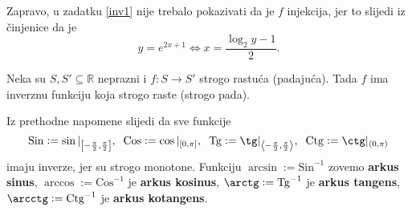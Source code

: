 \begin{remark}
Zapravo, u zadatku \ref{inv1} nije trebalo pokazivati da je $f$ injekcija, jer to slijedi iz činjenice da je
$$y=e^{2x+1}\Leftrightarrow x=\dfrac{\log_2{y}-1}{2}.$$
\end{remark}
\begin{remark}
Neka su $S, S'\subseteq \mathbb{R}$ neprazni i $f : S\to S'$ strogo rastuća (padajuća). Tada $f$ ima inverznu funkciju koja strogo raste (strogo pada).
\end{remark}
Iz prethodne napomene slijedi da sve funkcije $$\mathrm{Sin}:=\sin|_{\left[-\frac{\pi}{2},\frac{\pi}{2}\right]},\;\;\mathrm{Cos}:=\cos|_{\left[0, \pi\right]},\;\;\mathrm{Tg}:=\tg|_{\left\langle-\frac{\pi}{2},\frac{\pi}{2}\right\rangle},\;\;\mathrm{Ctg}:=\ctg|_{\left\langle 0, \pi\right\rangle}$$
imaju inverze, jer su strogo monotone. Funkciju $\arcsin:=\mathrm{Sin}^{-1}$ zovemo \textbf{arkus sinus}, $\arccos:=\mathrm{Cos}^{-1}$ je \textbf{arkus kosinus}, $\arctg:=\mathrm{Tg}^{-1}$ je \textbf{arkus tangens}, $\arcctg:=\mathrm{Ctg}^{-1}$ je \textbf{arkus kotangens}.


